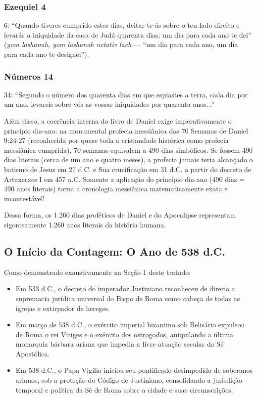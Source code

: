 \subsubsection*{Ezequiel 4}
6: ``Quando tiveres cumprido estes dias, deitar-te-ás sobre o teu lado direito e levarás a iniquidade da casa de Judá quarenta dias; um dia para cada ano te dei'' (\textit{yom lashanah, yom lashanah netativ lach} — ``um dia para cada ano, um dia para cada ano te designei'').

\subsubsection*{Números 14}
34: ``Segundo o número dos quarenta dias em que espiastes a terra, cada dia por um ano, levareis sobre vós as vossas iniquidades por quarenta anos...''

Além disso, a coerência interna do livro de Daniel exige imperativamente o princípio dia-ano: na monumental profecia messiânica das 70 Semanas de Daniel 9:24-27 (reconhecida por quase toda a cristandade histórica como profecia messiânica cumprida), 70 semanas equivalem a 490 dias simbólicos. Se fossem 490 dias literais (cerca de um ano e quatro meses), a profecia jamais teria alcançado o batismo de Jesus em 27 d.C. e Sua crucificação em 31 d.C. a partir do decreto de Artaxerxes I em 457 a.C. Somente a aplicação do princípio dia-ano (490 dias = 490 anos literais) torna a cronologia messiânica matematicamente exata e incontestável!

Dessa forma, os 1.260 dias proféticos de Daniel e do Apocalipse representam rigorosamente 1.260 anos literais da história humana.



\subsection{O Início da Contagem: O Ano de 538 d.C.}


Como demonstrado exaustivamente na Seção 1 deste tratado:
\begin{itemize}
  \item Em 533 d.C., o decreto do imperador Justiniano reconheceu de direito a supremacia jurídica universal do Bispo de Roma como cabeça de todas as igrejas e extirpador de hereges.
  \item Em março de 538 d.C., o exército imperial bizantino sob Belisário expulsou de Roma o rei Vitiges e o exército dos ostrogodos, aniquilando a última monarquia bárbara ariana que impedia a livre atuação secular da Sé Apostólica.
  \item Em 538 d.C., o Papa Vigílio iniciou seu pontificado desimpedido de soberanos arianos, sob a proteção do Código de Justiniano, consolidando a jurisdição temporal e política da Sé de Roma sobre a cidade e suas circunscrições.
\end{itemize}


